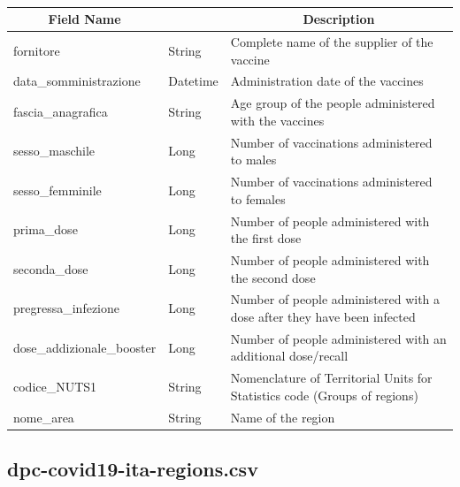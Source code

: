 \documentclass[a4paper,12pt]{article}
\begin{document}
\paragraph{}
\begin{center}
\begin{tabular}{|m{45mm}|>{\raggedright}m{16mm}|m{75mm}|}
\hline
\multicolumn{1}{|c|}{\textbf{ Field Name }}
& \multicolumn{1}{c|}{\textbf{ Data Type }} 
    	& \multicolumn{1}{c|}{\textbf{ Description }}\\
\hline
fornitore & String & Complete name of the supplier of the vaccine \\
\hline
data\_somministrazione & Datetime & Administration date of the vaccines \\
\hline
fascia\_anagrafica & String & Age group of the people administered with the vaccines \\
\hline
sesso\_maschile & Long & Number of vaccinations administered to males \\
\hline
sesso\_femminile & Long & Number of vaccinations administered to females \\
\hline
prima\_dose & Long & Number of people administered with the first dose \\
\hline
seconda\_dose & Long & Number of people administered with the second dose \\
\hline
pregressa\_infezione & Long & Number of people administered with a dose after they have
been infected \\
\hline
dose\_addizionale\_booster & Long & Number of people administered with an additional dose/recall \\
\hline
codice\_NUTS1 & String & Nomenclature of Territorial Units for Statistics code (Groups of regions) \\
\hline
nome\_area & String & Name of the region \\
\hline
\end{tabular}
\end{center}

\subsection{dpc-covid19-ita-regions.csv}
\end{document}
